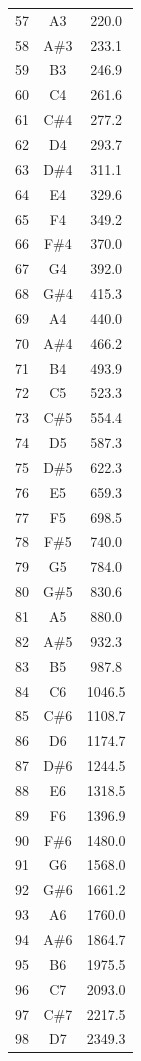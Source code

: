\documentclass[10pt]{book}
\begin{document}
\begin{spacing}{0.99}
\begin{supertabular}{ccc}
57  & A3  & 220.0  \\
58  & A\#3 & 233.1  \\
59  & B3  & 246.9  \\
60  & C4  & 261.6  \\
61  & C\#4 & 277.2  \\
62  & D4  & 293.7  \\
63  & D\#4 & 311.1  \\
64  & E4  & 329.6  \\
65  & F4  & 349.2  \\
66  & F\#4 & 370.0  \\
67  & G4  & 392.0  \\
68  & G\#4 & 415.3  \\
69  & A4  & 440.0  \\
70  & A\#4 & 466.2  \\
71  & B4  & 493.9  \\
72  & C5  & 523.3  \\
73  & C\#5 & 554.4  \\
74  & D5  & 587.3  \\
75  & D\#5 & 622.3  \\
76  & E5  & 659.3  \\
77  & F5  & 698.5  \\
78  & F\#5 & 740.0  \\
79  & G5  & 784.0  \\
80  & G\#5 & 830.6  \\
81  & A5  & 880.0  \\
82  & A\#5 & 932.3  \\
83  & B5  & 987.8  \\
84  & C6  & 1046.5 \\
85  & C\#6 & 1108.7 \\
86  & D6  & 1174.7 \\
87  & D\#6 & 1244.5 \\
88  & E6  & 1318.5 \\
89  & F6  & 1396.9 \\
90  & F\#6 & 1480.0 \\
91  & G6  & 1568.0 \\
92  & G\#6 & 1661.2 \\
93  & A6  & 1760.0 \\
94  & A\#6 & 1864.7 \\
95  & B6  & 1975.5 \\
96  & C7  & 2093.0 \\
97  & C\#7 & 2217.5 \\
98  & D7  & 2349.3 \\

\end{supertabular}
\end{spacing}
\end{document}
